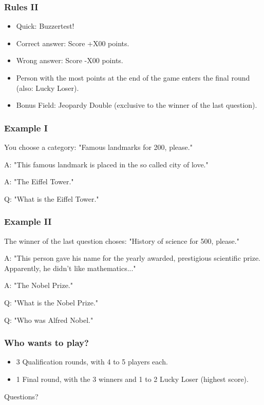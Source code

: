 \documentclass{beamer}
\begin{document}
		\begin{frame}
			\frametitle{Rules II}
			\begin{itemize}
			\item Quick: Buzzertest!
			\item Correct answer: Score +X00 points. 
			\item Wrong answer: Score -X00 points.
			\item Person with the most points at the end of the game enters the final round (also: Lucky Loser).
			\item Bonus Field: Jeopardy Double (exclusive to the winner of the last question).
		\end{itemize}
	\end{frame}
		

	
	\begin{frame}
		\frametitle{Example I }
		You choose a category: "Famous landmarks for 200, please."
		\vspace{1cm}
		\pause
		
		A: "This famous landmark is placed in the so called city of love."
		
		\vspace{1cm}
		
		\pause
		A: "The Eiffel Tower." \pause {\color{red}{Wrong! -200}}
		
		\pause
		Q: "What is the Eiffel Tower." {\color{green}{Right! +200}}
		
		
		
	\end{frame}	
	
		\begin{frame}
			\frametitle{Example II }
			The winner of the last question choses: "History of science for 500, please."
			\vspace{1cm}
			\pause
			
			A: "This person gave his name for the yearly awarded, prestigious scientific prize. Apparently, he didn't like mathematics..."
			
			\vspace{1cm}
			
			\pause
			A: "The Nobel Prize." \pause {\color{red}{Wrong! -500}}
			
			\pause
			Q: "What is the Nobel Prize." \pause {\color{red}{Wrong! -500}}
						
			\pause
			Q: "Who was Alfred Nobel." {\color{green}{Right! +500}}
			
			
			
		\end{frame}	
	
	
	
	\begin{frame}
		\frametitle{Who wants to play?}
		\begin{itemize}
		\item 3 Qualification rounds, with 4 to 5 players each.
		\item 1 Final round, with the 3 winners and 1 to 2 Lucky Loser (highest score).
		\end{itemize}
	\end{frame}
	
	\begin{frame}
		Questions?
	\end{frame}

	
	
	
	
	
\end{document}
